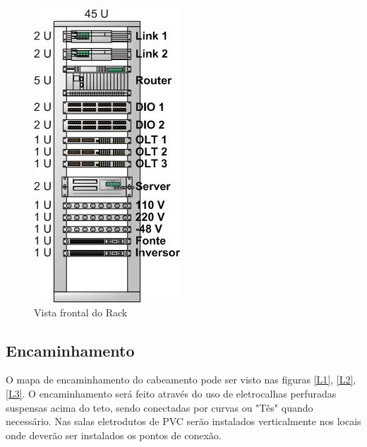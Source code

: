 \documentclass[	DIV=calc,%
							paper=a4,%
							fontsize=12pt,%
							onecolumn]{scrartcl}	 					%
\begin{document}
\begin{figure}
\centering
\includegraphics[height=\textwidth]{rack}
\caption{Vista frontal do Rack}
\label{rack}
\end{figure}




\subsection{Encaminhamento}
O mapa de encaminhamento do cabeamento pode ser visto nas figuras \ref{L1}, \ref{L2}, \ref{L3}. O encaminhamento será feito através do uso de eletrocalhas perfuradas suspensas acima do teto, sendo conectadas por curvas ou "Tês" quando necessário.
Nas salas eletrodutos de PVC serão instalados verticalmente nos locais onde deverão ser instalados os pontos de conexão.
\end{document}
